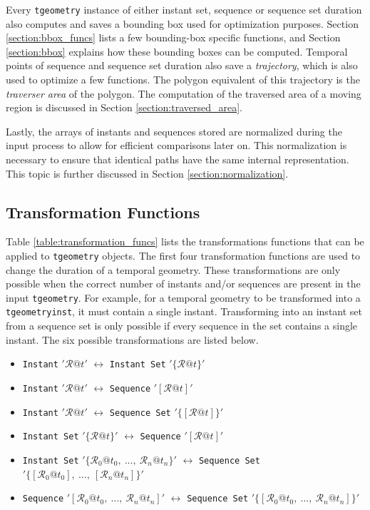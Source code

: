 Every \lstinline+tgeometry+ instance of either instant set, sequence or sequence set duration also computes and saves a bounding box used for optimization purposes. Section \ref{section:bbox_funcs} lists a few bounding-box specific functions, and Section \ref{section:bbox} explains how these bounding boxes can be computed. Temporal points of sequence and sequence set duration also save a \textit{trajectory}, which is also used to optimize a few functions. The polygon equivalent of this trajectory is the \textit{traverser area} of the polygon. The computation of the traversed area of a moving region is discussed in Section \ref{section:traversed_area}.

Lastly, the arrays of instants and sequences stored are normalized during the input process to allow for efficient comparisons later on. This normalization is necessary to ensure that identical paths have the same internal representation. This topic is further discussed in Section \ref{section:normalization}.

\subsection{Transformation Functions}
\label{section:transformation_funcs}

Table \ref{table:transformation_funcs} lists the transformations functions that can be applied to \lstinline+tgeometry+ objects. The first four transformation functions are used to change the duration of a temporal geometry. These transformations are only possible when the correct number of instants and/or sequences are present in the input \lstinline+tgeometry+. For example, for a temporal geometry to be transformed into a \lstinline+tgeometryinst+, it must contain a single instant. Transforming into an instant set from a sequence set is only possible if every sequence in the set contains a single instant. The six possible transformations are listed below.

\begin{itemize}
    \item \lstinline+Instant+ $'\mathcal{R}@t'$ $\leftrightarrow$ \lstinline+Instant Set+ $'\{\mathcal{R}@t\}'$
    \item \lstinline+Instant+ $'\mathcal{R}@t'$ $\leftrightarrow$ \lstinline+Sequence+ $'[\mathcal{R}@t]'$
    \item \lstinline+Instant+ $'\mathcal{R}@t'$ $\leftrightarrow$ \lstinline+Sequence Set+ $'\{[\mathcal{R}@t]\}'$
    \item \lstinline+Instant Set+ $'\{\mathcal{R}@t\}'$ $\leftrightarrow$ \lstinline+Sequence+ $'[\mathcal{R}@t]'$
    \item \lstinline+Instant Set+ $'\{\mathcal{R}_0@t_0,\ ...,\ \mathcal{R}_n@t_n\}'$ $\leftrightarrow$ \lstinline+Sequence Set+ $'\{[\mathcal{R}_0@t_0],\ ...,\ [\mathcal{R}_n@t_n]\}'$
    \item \lstinline+Sequence+ $'[\mathcal{R}_0@t_0,\ ...,\ \mathcal{R}_n@t_n]'$ $\leftrightarrow$ \lstinline+Sequence Set+ $'\{[\mathcal{R}_0@t_0,\ ...,\ \mathcal{R}_n@t_n]\}'$
\end{itemize}

